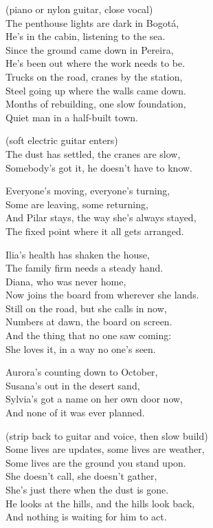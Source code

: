 \begin{lyrics}
 (piano or nylon guitar, close vocal)\\
The penthouse lights are dark in Bogotá,\\
He's in the cabin, listening to the sea.\\
Since the ground came down in Pereira,\\
He's been out where the work needs to be.\\
Trucks on the road, cranes by the station,\\
Steel going up where the walls came down.\\
Months of rebuilding, one slow foundation,\\
Quiet man in a half-built town.

 (soft electric guitar enters)\\
The dust has settled, the cranes are slow,\\
Somebody's got it, he doesn't have to know.

Everyone's moving, everyone's turning,\\
Some are leaving, some returning,\\
And Pilar stays, the way she's always stayed,\\
The fixed point where it all gets arranged.

Ilia's health has shaken the house,\\
The family firm needs a steady hand.\\
Diana, who was never home,\\
Now joins the board from wherever she lands.\\
Still on the road, but she calls in now,\\
Numbers at dawn, the board on screen.\\
And the thing that no one saw coming:\\
She loves it, in a way no one's seen.

Aurora's counting down to October,\\
Susana's out in the desert sand,\\
Sylvia's got a name on her own door now,\\
And none of it was ever planned.

 (strip back to guitar and voice, then slow build)\\
Some lives are updates, some lives are weather,\\
Some lives are the ground you stand upon.\\
She doesn't call, she doesn't gather,\\
She's just there when the dust is gone.\\
He looks at the hills, and the hills look back,\\
And nothing is waiting for him to act.


\end{lyrics}
